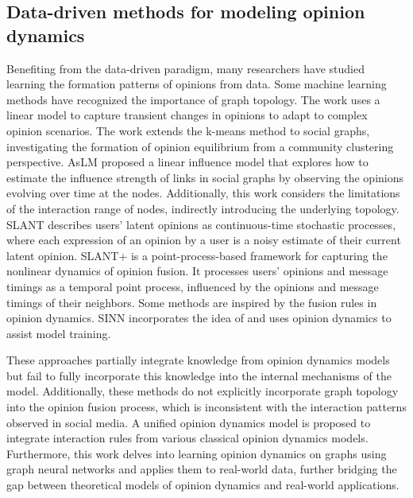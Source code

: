 \subsection{Data-driven methods for modeling opinion dynamics}

Benefiting from the data-driven paradigm, many researchers have studied learning the formation patterns of opinions from data. Some machine learning methods have recognized the importance of graph topology. The work \cite{transient} uses a linear model to capture transient changes in opinions to adapt to complex opinion scenarios. The work \cite{kmeans} extends the k-means method to social graphs, investigating the formation of opinion equilibrium from a community clustering perspective. AsLM \cite{aslm} proposed a linear influence model that explores how to estimate the influence strength of links in social graphs by observing the opinions evolving over time at the nodes. Additionally, this work considers the limitations of the interaction range of nodes, indirectly introducing the underlying topology. SLANT \cite{slant} describes users' latent opinions as continuous-time stochastic processes, where each expression of an opinion by a user is a noisy estimate of their current latent opinion. SLANT+ \cite{slant+} is a point-process-based framework for capturing the nonlinear dynamics of opinion fusion. It processes users' opinions and message timings as a temporal point process, influenced by the opinions and message timings of their neighbors. Some methods are inspired by the fusion rules in opinion dynamics. SINN \cite{sinn} incorporates the idea of \cite{climate, Physicsguided} and uses opinion dynamics to assist model training.

These approaches partially integrate knowledge from opinion dynamics models but fail to fully incorporate this knowledge into the internal mechanisms of the model. Additionally, these methods do not explicitly incorporate graph topology into the opinion fusion process, which is inconsistent with the interaction patterns observed in social media. A unified opinion dynamics model is proposed to integrate interaction rules from various classical opinion dynamics models. Furthermore, this work delves into learning opinion dynamics on graphs using graph neural networks and applies them to real-world data, further bridging the gap between theoretical models of opinion dynamics and real-world applications.
